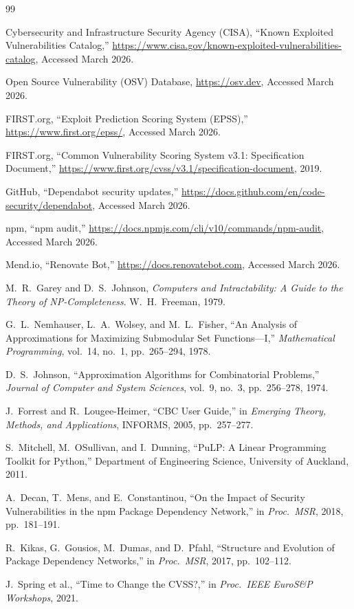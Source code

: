 \documentclass[conference]{IEEEtran}
\begin{document}

\begin{thebibliography}{99}

Cybersecurity and Infrastructure Security Agency (CISA),
``Known Exploited Vulnerabilities Catalog,''
\url{https://www.cisa.gov/known-exploited-vulnerabilities-catalog},
Accessed March 2026.

Open Source Vulnerability (OSV) Database,
\url{https://osv.dev},
Accessed March 2026.

FIRST.org,
``Exploit Prediction Scoring System (EPSS),''
\url{https://www.first.org/epss/},
Accessed March 2026.

FIRST.org,
``Common Vulnerability Scoring System v3.1: Specification Document,''
\url{https://www.first.org/cvss/v3.1/specification-document},
2019.

GitHub,
``Dependabot security updates,''
\url{https://docs.github.com/en/code-security/dependabot},
Accessed March 2026.

npm,
``npm audit,''
\url{https://docs.npmjs.com/cli/v10/commands/npm-audit},
Accessed March 2026.

Mend.io,
``Renovate Bot,''
\url{https://docs.renovatebot.com},
Accessed March 2026.

M.~R.~Garey and D.~S.~Johnson,
\emph{Computers and Intractability: A Guide to the Theory of NP-Completeness}.
W.~H.~Freeman, 1979.

G.~L.~Nemhauser, L.~A.~Wolsey, and M.~L.~Fisher,
``An Analysis of Approximations for Maximizing Submodular Set Functions---I,''
\emph{Mathematical Programming}, vol.~14, no.~1, pp.~265--294, 1978.

D.~S.~Johnson,
``Approximation Algorithms for Combinatorial Problems,''
\emph{Journal of Computer and System Sciences}, vol.~9, no.~3,
pp.~256--278, 1974.

J.~Forrest and R.~Lougee-Heimer,
``CBC User Guide,''
in \emph{Emerging Theory, Methods, and Applications}, INFORMS, 2005,
pp.~257--277.

S.~Mitchell, M.~OSullivan, and I.~Dunning,
``PuLP: A Linear Programming Toolkit for Python,''
Department of Engineering Science, University of Auckland, 2011.

A.~Decan, T.~Mens, and E.~Constantinou,
``On the Impact of Security Vulnerabilities in the npm Package Dependency Network,''
in \emph{Proc.\ MSR}, 2018, pp.~181--191.

R.~Kikas, G.~Gousios, M.~Dumas, and D.~Pfahl,
``Structure and Evolution of Package Dependency Networks,''
in \emph{Proc.\ MSR}, 2017, pp.~102--112.

J.~Spring et al.,
``Time to Change the CVSS?,''
in \emph{Proc.\ IEEE EuroS\&P Workshops}, 2021.

\end{thebibliography}
\end{document}
